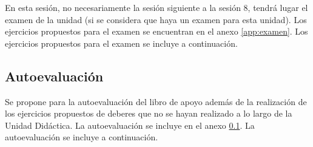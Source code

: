 En esta sesión, no necesariamente la sesión siguiente a la sesión 8, tendrá lugar el examen de la unidad (si se considera que haya un examen para esta unidad).
%
\ifinapp
	Los ejercicios propuestos para el examen se encuentran en el anexo \ref{app:examen}.
\else 
	Los ejercicios propuestos para el examen se incluye a continuación.
	
\fi


\subsection{Autoevaluación}
\label{app:autoeval}

Se propone para la autoevaluación del libro de apoyo \cite[p. 120]{MareaVerde} además de la realización de los ejercicios propuestos de deberes que no se hayan realizado a lo largo de la Unidad Didáctica.
%
\ifinapp
	La autoevaluación se incluye en el anexo \ref{app:autoeval}.
\else 
	La autoevaluación se incluye a continuación.
	
\fi


